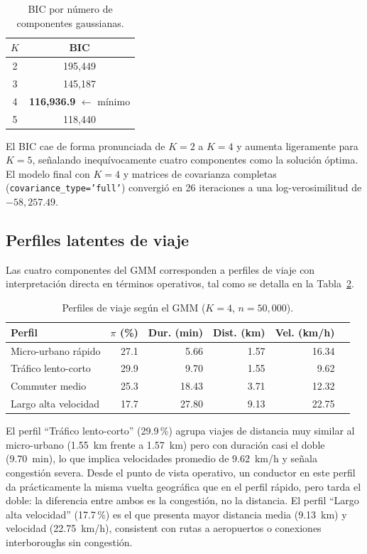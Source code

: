\documentclass[12pt, a4paper]{article}
\begin{document}
\begin{table}[H]
  \centering
  \caption{BIC por número de componentes gaussianas.}
  \label{tab:bic}
  \small
  \begin{tabular}{cc}
    \toprule
    $K$ & \textbf{BIC} \\
    \midrule
    2 & 195{,}449 \\
    3 & 145{,}187 \\
    4 & \textbf{116{,}936{.}9} \quad $\leftarrow$ mínimo \\
    5 & 118{,}440 \\
    \bottomrule
  \end{tabular}
\end{table}

El BIC cae de forma pronunciada de $K=2$ a $K=4$ y aumenta ligeramente para $K=5$, señalando inequívocamente cuatro componentes como la solución óptima. El modelo final con $K=4$ y matrices de covarianza completas (\texttt{covariance\_type='full'}) convergió en 26 iteraciones a una log-verosimilitud de $-58{,}257{.}49$.

\subsection{Perfiles latentes de viaje}

Las cuatro componentes del GMM corresponden a perfiles de viaje con interpretación directa en términos operativos, tal como se detalla en la Tabla~\ref{tab:gmm}.

\begin{table}[H]
  \centering
  \caption{Perfiles de viaje según el GMM ($K=4$, $n=50{,}000$).}
  \label{tab:gmm}
  \small
  \begin{tabular}{lrrrrl}
    \toprule
    \textbf{Perfil} & \textbf{$\pi$ (\%)} & \textbf{Dur. (min)} & \textbf{Dist. (km)} & \textbf{Vel. (km/h)} \\
    \midrule
    Micro-urbano rápido     & 27{.}1 &  5{.}66 & 1{.}57 & 16{.}34 \\
    Tráfico lento-corto     & 29{.}9 &  9{.}70 & 1{.}55 &  9{.}62 \\
    Commuter medio          & 25{.}3 & 18{.}43 & 3{.}71 & 12{.}32 \\
    Largo alta velocidad    & 17{.}7 & 27{.}80 & 9{.}13 & 22{.}75 \\
    \bottomrule
  \end{tabular}
\end{table}

El perfil ``Tráfico lento-corto'' (29{.}9\,\%) agrupa viajes de distancia muy similar al micro-urbano (1{.}55~km frente a 1{.}57~km) pero con duración casi el doble (9{.}70~min), lo que implica velocidades promedio de 9{.}62~km/h y señala congestión severa. Desde el punto de vista operativo, un conductor en este perfil da prácticamente la misma vuelta geográfica que en el perfil rápido, pero tarda el doble: la diferencia entre ambos es la congestión, no la distancia. El perfil ``Largo alta velocidad'' (17{.}7\,\%) es el que presenta mayor distancia media (9{.}13~km) y velocidad (22{.}75~km/h), consistent con rutas a aeropuertos o conexiones interboroughs sin congestión.
\end{document}
